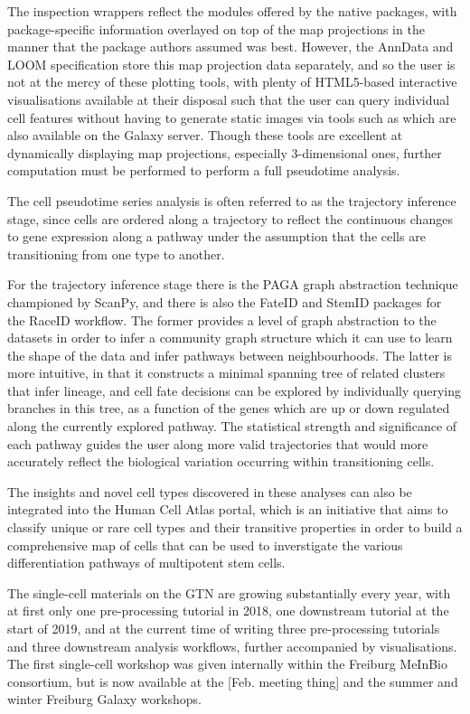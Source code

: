 \documentclass[a4paper,num-refs]{oup-contemporary}
\begin{document}
The inspection wrappers reflect the modules offered by the native packages, with package-specific information overlayed on top of the map projections in the manner that the package authors assumed was best. However, the AnnData and LOOM specification store this map projection data separately, and so the user is not at the mercy of these plotting tools, with plenty of HTML5-based interactive visualisations available at their disposal such that the user can query individual cell features without having to generate static images via tools such as  which are also available on the Galaxy server. Though these tools are excellent at dynamically displaying map projections, especially 3-dimensional ones, further computation must be performed to perform a full pseudotime analysis.

The cell pseudotime series analysis is often referred to as the trajectory inference stage, since cells are ordered along a trajectory to reflect the continuous changes to gene expression along a pathway under the assumption that the cells are transitioning from one type to another.

For the trajectory inference stage there is the PAGA graph abstraction technique championed by ScanPy, and there is also the FateID and StemID packages for the RaceID workflow. The former provides a level of graph abstraction to the datasets in order to infer a community graph structure which it can use to learn the shape of the data and infer pathways between neighbourhoods. The latter is more intuitive, in that it constructs a minimal spanning tree of related clusters that infer lineage, and cell fate decisions can be explored by individually querying branches in this tree, as a function of the genes which are up or down regulated along the currently explored pathway. The statistical strength and significance of each pathway guides the user along more valid trajectories that would more accurately reflect the biological variation occurring within transitioning cells.

The insights and novel cell types discovered in these analyses can also be integrated into the Human Cell Atlas portal, which is an initiative that aims to classify unique or rare cell types and their transitive properties in order to build a comprehensive map of cells that can be used to inverstigate the various differentiation pathways of multipotent stem cells.

The single-cell materials on the GTN are growing substantially every year, with at first only one pre-processing tutorial in 2018, one downstream tutorial at the start of 2019, and at the current time of writing three pre-processing tutorials and three downstream analysis workflows, further accompanied by visualisations. The first single-cell workshop was given internally within the Freiburg MeInBio consortium, but is now available at the [Feb. meeting thing] and the summer and winter Freiburg Galaxy workshops.
\end{document}
